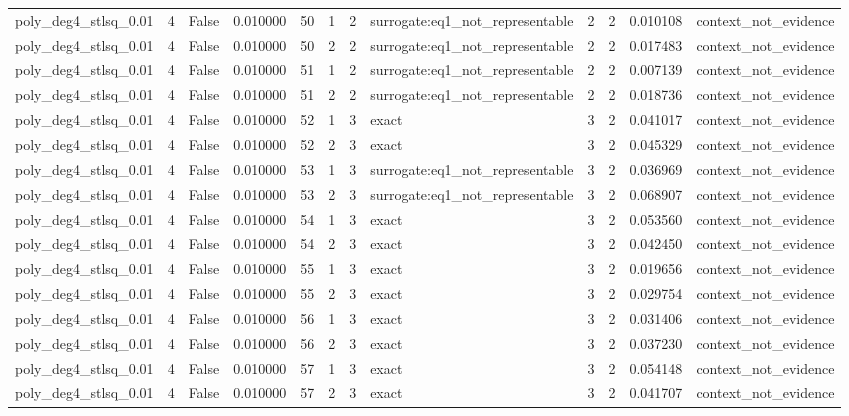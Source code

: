 \begin{tabular}{lrrrrrrlrrrl}
poly\_deg4\_stlsq\_0.01 & 4 & False & 0.010000 & 50 & 1 & 2 & surrogate:eq1\_not\_representable & 2 & 2 & 0.010108 & context\_not\_evidence \\
poly\_deg4\_stlsq\_0.01 & 4 & False & 0.010000 & 50 & 2 & 2 & surrogate:eq1\_not\_representable & 2 & 2 & 0.017483 & context\_not\_evidence \\
poly\_deg4\_stlsq\_0.01 & 4 & False & 0.010000 & 51 & 1 & 2 & surrogate:eq1\_not\_representable & 2 & 2 & 0.007139 & context\_not\_evidence \\
poly\_deg4\_stlsq\_0.01 & 4 & False & 0.010000 & 51 & 2 & 2 & surrogate:eq1\_not\_representable & 2 & 2 & 0.018736 & context\_not\_evidence \\
poly\_deg4\_stlsq\_0.01 & 4 & False & 0.010000 & 52 & 1 & 3 & exact & 3 & 2 & 0.041017 & context\_not\_evidence \\
poly\_deg4\_stlsq\_0.01 & 4 & False & 0.010000 & 52 & 2 & 3 & exact & 3 & 2 & 0.045329 & context\_not\_evidence \\
poly\_deg4\_stlsq\_0.01 & 4 & False & 0.010000 & 53 & 1 & 3 & surrogate:eq1\_not\_representable & 3 & 2 & 0.036969 & context\_not\_evidence \\
poly\_deg4\_stlsq\_0.01 & 4 & False & 0.010000 & 53 & 2 & 3 & surrogate:eq1\_not\_representable & 3 & 2 & 0.068907 & context\_not\_evidence \\
poly\_deg4\_stlsq\_0.01 & 4 & False & 0.010000 & 54 & 1 & 3 & exact & 3 & 2 & 0.053560 & context\_not\_evidence \\
poly\_deg4\_stlsq\_0.01 & 4 & False & 0.010000 & 54 & 2 & 3 & exact & 3 & 2 & 0.042450 & context\_not\_evidence \\
poly\_deg4\_stlsq\_0.01 & 4 & False & 0.010000 & 55 & 1 & 3 & exact & 3 & 2 & 0.019656 & context\_not\_evidence \\
poly\_deg4\_stlsq\_0.01 & 4 & False & 0.010000 & 55 & 2 & 3 & exact & 3 & 2 & 0.029754 & context\_not\_evidence \\
poly\_deg4\_stlsq\_0.01 & 4 & False & 0.010000 & 56 & 1 & 3 & exact & 3 & 2 & 0.031406 & context\_not\_evidence \\
poly\_deg4\_stlsq\_0.01 & 4 & False & 0.010000 & 56 & 2 & 3 & exact & 3 & 2 & 0.037230 & context\_not\_evidence \\
poly\_deg4\_stlsq\_0.01 & 4 & False & 0.010000 & 57 & 1 & 3 & exact & 3 & 2 & 0.054148 & context\_not\_evidence \\
poly\_deg4\_stlsq\_0.01 & 4 & False & 0.010000 & 57 & 2 & 3 & exact & 3 & 2 & 0.041707 & context\_not\_evidence \\

\end{tabular}
